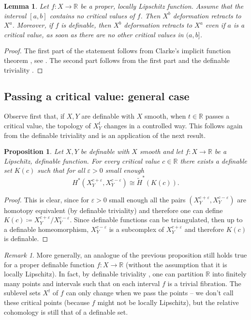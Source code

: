 \documentclass{amsart}
\newcommand{\R}{\mathbb{R}}
\newtheorem{proposition}[subsubsection]{Proposition}
\newtheorem{lemma}[subsubsection]{Lemma}
\theoremstyle{definition}
\theoremstyle{remark}
\newtheorem{remark}[subsubsection]{Remark}
\begin{document}
\begin{lemma}
\label{lem:deformation}
Let $f \colon X \to \R$ be a proper, locally Lipschitz function. Assume that the interval $[a, b]$ contains no critical values of $f$. Then $X^b$ deformation retracts to $X^a$. 
Moreover, if $f$ is definable, then $X^b$ deformation retracts to $X^a$ even if $a$ is a critical value, as soon as there are no other critical values in $(a, b]$.
\end{lemma}
\begin{proof}
The first part of the statement follows from Clarke's implicit function theorem \cite[Theorem 1]{clarkeIFT}, see \cite[Proposition 1.2]{APS1997}. The second part follows from the first  part and the definable triviality \cite[Chapter 9, Theorem 1.2]{vdd}.
\end{proof}

\subsection{Passing a critical value: general case}\label{sec:triviality}
Observe first that, if $X, Y$ are definable with $X$ smooth, when $t \in \R$ passes a critical value, the topology of $X_Y^t$ changes in a controlled way. This follows again from the definable triviality and is an application of the next result. 
\begin{proposition}
\label{propo:criticalpass1}
Let $X, Y$ be definable with $X$ smooth and let $f \colon X \to \R$ be a Lipschitz, definable function. For every critical value $c \in \mathbb{R}$ there exists a definable set $K(c)$ such that for all $\varepsilon > 0$ small enough
\[
H^*(X_Y^{c + \varepsilon}, X_Y^{c - \varepsilon}) \cong \widetilde{H}^*(K(c)).
\]
\end{proposition}
\begin{proof}
This is clear, since for $\varepsilon > 0$ small enough all the pairs $(X_Y^{c + \varepsilon}, X_Y^{c - \varepsilon})$ are homotopy equivalent (by definable triviality) and therefore one can define $K(c) \coloneqq X_Y^{c + \varepsilon}/X_Y^{c - \varepsilon}$. Since definable functions can be triangulated, then up to a definable homeomorphism, $X_Y^{c - \varepsilon}$ is a subcomplex of $X_Y^{c + \varepsilon}$ and therefore $K(c)$ is definable.
\end{proof}

\begin{remark}More generally, an analogue of the previous proposition still holds true for a proper definable function $f \colon X\to \R$ (without the assumption that it is locally Lipschitz). 
In fact, by definable triviality \cite[Chapter 9, Theorem 1.2]{vdd},  one can partition $\R$ into finitely many points and intervals such that on each interval $f$ is a trivial fibration. The sublevel sets $X^t$ of $f$ can only change when we pass the points -- we don't call these critical points (because $f$ might not be locally Lipschitz), but the relative cohomology is still that of a definable set.
\end{remark}
\end{document}
